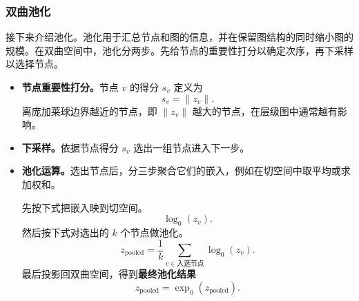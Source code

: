 \subsubsection{双曲池化}
接下来介绍池化。池化用于汇总节点和图的信息，并在保留图结构的同时缩小图的规模。在双曲空间中，池化分两步。先给节点的重要性打分以确定次序，再下采样以选择节点。
\begin{itemize}
  \item \textbf{节点重要性打分。}节点 $v$ 的得分 $s_v$ 定义为
  \begin{equation*}
    s_v=\lVert z_v\rVert.
    \tag{2.142}\label{eq:2.142}
  \end{equation*}
  离庞加莱球边界越近的节点，即 $\lVert z_v\rVert$ 越大的节点，在层级图中通常越有影响。
  \item \textbf{下采样。}依据节点得分 $s_v$ 选出一组节点进入下一步。
  \item \textbf{池化运算。}选出节点后，分三步聚合它们的嵌入，例如在切空间中取平均或求加权和。

  先按下式把嵌入映到切空间。
  \[
    \log_0(z_v).
  \]
  然后按下式对选出的 $k$ 个节点做池化。
  \begin{equation*}
    z_{\mathrm{pooled}}=\frac1k\sum_{v\in\text{入选节点}}\log_0(z_v).
    \tag{2.143}\label{eq:2.143}
  \end{equation*}
  最后投影回双曲空间，得到\textbf{最终池化结果}
  \[
    z_{\mathrm{pooled}}=\exp_0(z_{\mathrm{pooled}}).
  \]
\end{itemize}

